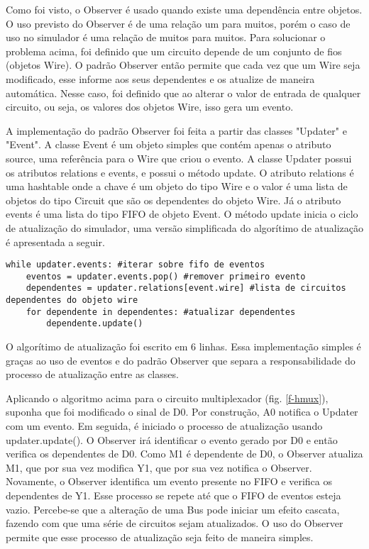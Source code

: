 Como foi visto, o Observer é usado quando existe uma dependência entre objetos.
O uso previsto do Observer é de uma relação um para muitos, porém o caso de uso no simulador é uma relação de muitos para muitos.
Para solucionar o problema acima, foi definido que um circuito depende de um conjunto de fios (objetos Wire).
O padrão Observer então permite que cada vez que um Wire seja modificado, esse informe aos seus dependentes e os atualize de maneira automática.
Nesse caso, foi definido que ao alterar o valor de entrada de qualquer circuito, ou seja, os valores dos objetos Wire, isso gera um evento.

A implementação do padrão Observer foi feita a partir das classes "Updater" e "Event".
A classe Event é um objeto simples que contém apenas o atributo source, uma referência para o Wire que criou o evento.
A classe Updater possui os atributos relations e events, e possui o método update.
O atributo relations é uma hashtable onde a chave é um objeto do tipo Wire e o valor é uma lista de objetos do tipo Circuit que são os dependentes do objeto Wire.
Já o atributo events é uma lista do tipo FIFO de objeto Event.
O método update inicia o ciclo de atualização do simulador, uma versão simplificada do algorítimo de atualização é apresentada a seguir.
\begin{lstlisting}
while updater.events: #iterar sobre fifo de eventos
    eventos = updater.events.pop() #remover primeiro evento
    dependentes = updater.relations[event.wire] #lista de circuitos dependentes do objeto wire
    for dependente in dependentes: #atualizar dependentes
        dependente.update()
\end{lstlisting}
O algorítimo de atualização foi escrito em 6 linhas.
Essa implementação simples é graças ao uso de eventos e do padrão Observer que separa a responsabilidade do processo de atualização entre as classes.

Aplicando o algoritmo acima para o circuito multiplexador (fig. \ref{f-hmux}), suponha que foi modificado o sinal de D0.
Por construção, A0 notifica o Updater com um evento.
Em seguida, é iniciado o processo de atualização usando updater.update().
O Observer irá identificar o evento gerado por D0 e então verifica os dependentes de D0.
Como M1 é dependente de D0, o Observer atualiza M1, que por sua vez modifica Y1, que por sua vez notifica o Observer.
Novamente, o Observer identifica um evento presente no FIFO e verifica os dependentes de Y1.
Esse processo se repete até que o FIFO de eventos esteja vazio.
Percebe-se que a alteração de uma Bus pode iniciar um efeito cascata, fazendo com que uma série de circuitos sejam atualizados.
O uso do Observer permite que esse processo de atualização seja feito de maneira simples.

